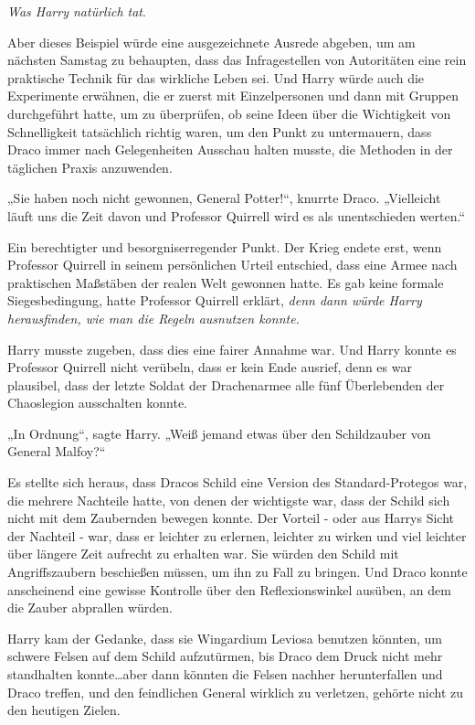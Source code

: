 {\emph{Was Harry natürlich tat}.

Aber dieses Beispiel würde eine ausgezeichnete Ausrede abgeben, um am nächsten Samstag zu behaupten, dass das Infragestellen von Autoritäten eine rein praktische Technik für das wirkliche Leben sei. Und Harry würde auch die Experimente erwähnen, die er zuerst mit Einzelpersonen und dann mit Gruppen durchgeführt hatte, um zu überprüfen, ob seine Ideen über die Wichtigkeit von Schnelligkeit tatsächlich richtig waren, um den Punkt zu untermauern, dass Draco immer nach Gelegenheiten Ausschau halten musste, die Methoden in der täglichen Praxis anzuwenden.

„Sie haben noch nicht gewonnen, General Potter!“, knurrte Draco. „Vielleicht läuft uns die Zeit davon und Professor Quirrell wird es als unentschieden werten.“

Ein berechtigter und besorgniserregender Punkt. Der Krieg endete erst, wenn Professor Quirrell in seinem persönlichen Urteil entschied, dass eine Armee nach praktischen Maßstäben der realen Welt gewonnen hatte. Es gab keine formale Siegesbedingung, hatte Professor Quirrell erklärt, \emph{denn dann würde Harry herausfinden, wie man die Regeln ausnutzen konnte.}

Harry musste zugeben, dass dies eine fairer Annahme war. Und Harry konnte es Professor Quirrell nicht verübeln, dass er kein Ende ausrief, denn es war plausibel, dass der letzte Soldat der Drachenarmee alle fünf Überlebenden der Chaoslegion ausschalten konnte.

„In Ordnung“, sagte Harry. „Weiß jemand etwas über den Schildzauber von General Malfoy?“

Es stellte sich heraus, dass Dracos Schild eine Version des Standard-Protegos war, die mehrere Nachteile hatte, von denen der wichtigste war, dass der Schild sich nicht mit dem Zaubernden bewegen konnte. Der Vorteil - oder aus Harrys Sicht der Nachteil - war, dass er leichter zu erlernen, leichter zu wirken und viel leichter über längere Zeit aufrecht zu erhalten war. Sie würden den Schild mit Angriffszaubern beschießen müssen, um ihn zu Fall zu bringen. Und Draco konnte anscheinend eine gewisse Kontrolle über den Reflexionswinkel ausüben, an dem die Zauber abprallen würden.

Harry kam der Gedanke, dass sie Wingardium Leviosa benutzen könnten, um schwere Felsen auf dem Schild aufzutürmen, bis Draco dem Druck nicht mehr standhalten konnte…aber dann könnten die Felsen nachher herunterfallen und Draco treffen, und den feindlichen General wirklich zu verletzen, gehörte nicht zu den heutigen Zielen.

}
